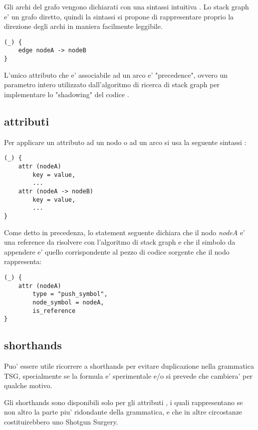 Gli archi del grafo vengono dichiarati con una sintassi intuitiva \cite{TreeSitterGraphReferenceEdges}.
Lo stack graph e' un grafo diretto, quindi la sintassi si propone di rappresentare proprio la direzione degli archi in maniera facilmente leggibile.

\begin{Verbatim}[samepage=true]
(_) {
    edge nodeA -> nodeB
}
\end{Verbatim}

L'unico attributo che e' associabile ad un arco e' "precedence", ovvero un parametro intero utilizzato dall'algoritmo di ricerca di stack graph per implementare lo "shadowing" del codice \cite{TreeSitterStackGraphEdges}.

\subsection{attributi}

Per applicare un attributo ad un nodo o ad un arco si usa la seguente sintassi \cite{TreeSitterGraphReferenceAttributes}:

\begin{Verbatim}[samepage=true]
(_) {
    attr (nodeA)
        key = value,
        ...
    attr (nodeA -> nodeB)
        key = value,
        ...
}
\end{Verbatim}

Come detto in precedenza, lo statement seguente dichiara che il nodo \emph{nodeA} e' una reference da risolvere con l'algoritmo di stack graph e che il simbolo da appendere e' quello corrispondente al pezzo di codice sorgente che il nodo rappresenta:

\begin{Verbatim}[samepage=true]
(_) {
    attr (nodeA)
        type = "push_symbol",
        node_symbol = nodeA,
        is_reference
}
\end{Verbatim}

\subsection{shorthands}
Puo' essere utile ricorrere a shorthands per evitare duplicazione nella grammatica TSG, specialmente se la formula e' sperimentale e/o si prevede che cambiera' per qualche motivo.

Gli shorthands sono disponibili solo per gli attributi \cite{TreeSitterGraphReferenceAttributeShorthands}, i quali rappresentano se non altro la parte piu' ridondante della grammatica, e che in altre circostanze costituirebbero uno Shotgun Surgery.

